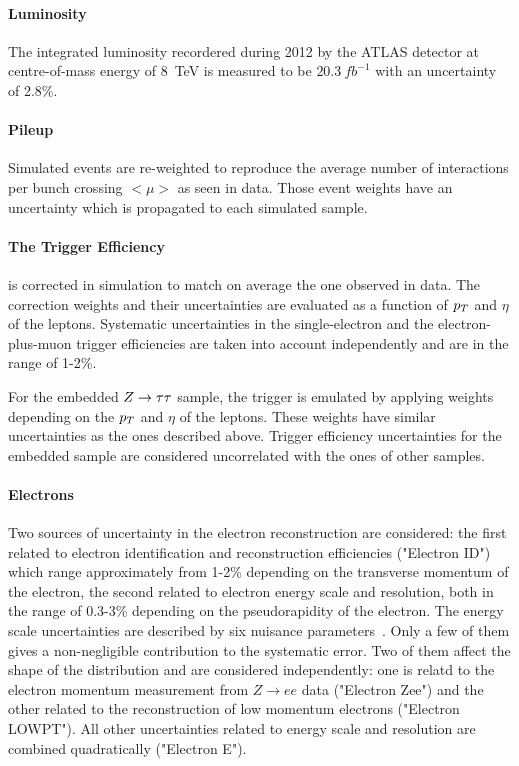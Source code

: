 \paragraph{Luminosity}
The integrated luminosity recordered during 2012 by the ATLAS detector at centre-of-mass energy of 8~TeV is measured 
to be $20.3 ~ fb^{-1}$ \cite{luminosity} with an uncertainty  of  2.8\%.

\paragraph{Pileup}
Simulated events are re-weighted to reproduce the average number of interactions per bunch crossing $<\mu>$ as seen in data. 
Those event weights have an uncertainty which is propagated to each simulated sample.

\paragraph{The Trigger Efficiency}
is corrected in simulation to match on  average the one observed in data. The correction weights and their uncertainties 
are evaluated as a function of $p_{T}$ and $\eta$ of the leptons. 
Systematic uncertainties in the single-electron and the electron-plus-muon trigger efficiencies are taken into account 
independently and are in the range of 1-2\%.

For the embedded $Z\rightarrow \tau\tau$ sample, the trigger is emulated by applying weights  depending on the  $p_{T}$ and $\eta$ of the leptons. 
These weights  have similar uncertainties as the ones described above. Trigger efficiency uncertainties for the embedded sample 
 are considered uncorrelated with the ones of other samples.

\paragraph{Electrons}
Two sources of uncertainty in the electron reconstruction are considered:
the first  related to electron identification and reconstruction efficiencies ("Electron ID") which range approximately from 1-2\%
depending on the transverse momentum of the electron, 
the second related to electron energy scale  and resolution, both in the range of 0.3-3\% depending on the pseudorapidity of the electron. 
The energy scale uncertainties are described by six nuisance parameters~\cite{eleEnergy}.
Only a few of them gives a non-negligible contribution to the systematic error. Two of them 
affect the shape of the \mmc distribution and are considered independently: one is relatd to the electron  
momentum measurement from  $Z \rightarrow ee$ data ("Electron Zee") 
and the other related to the reconstruction of low momentum electrons ("Electron LOWPT"). 
All other uncertainties related to energy scale and resolution are combined quadratically ("Electron E").


